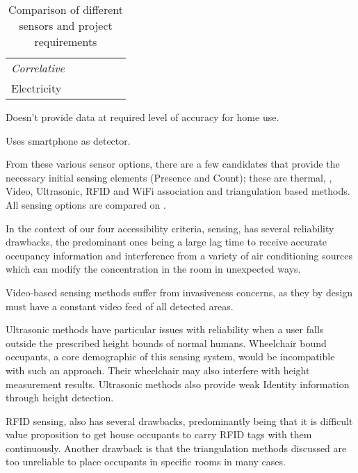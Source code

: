 \documentclass[../thesis/thesis.tex]{subfiles}
\begin{document}
\begin{table}
\begin{threeparttable}
\begin{tabularx}{\textwidth}{|l|l|l||l||l|l|}
\hspace{3mm}\textit{Correlative} 	& & & & & \\
\hspace{8mm}Electricity 		& \cmark\ssup & \xmark & \cmark & & \\

\cline{1-6}
\end{tabularx}
\begin{tablenotes}
\item \ssup  Doesn't provide data at required level of accuracy for home use.
\item \tsup  Uses smartphone as detector.
\end{tablenotes}
\end{threeparttable}
\caption{Comparison of different sensors and project requirements}
\label{tab:litreview:taxonomycomp}
\end{table}

From these various sensor options, there are a few candidates that provide the necessary initial sensing elements (Presence and Count); these are thermal, \cdi, Video, Ultrasonic, RFID and WiFi association and triangulation based methods. All sensing options are compared on .

In the context of our four accessibility criteria, \cdi sensing, has several reliability drawbacks, the predominant ones being a large lag time to receive accurate occupancy information and interference from a variety of air conditioning sources which can modify the \cdi concentration in the room in unexpected ways.

Video-based sensing methods suffer from invasiveness concerns, as they by design must have a constant video feed of all detected areas.

Ultrasonic methods have particular issues with reliability when a user falls outside the prescribed height bounds of normal humans. Wheelchair bound occupants, a core demographic of this sensing system, would be incompatible with such an approach. Their wheelchair may also interfere with height measurement results. Ultrasonic methods also provide weak Identity information through height detection.

RFID sensing, also has several drawbacks, predominantly being that it is difficult value proposition to get house occupants to carry RFID tags with them continuously. Another drawback is that the triangulation methods discussed are too unreliable to place occupants in specific rooms in many cases.
\end{document}
